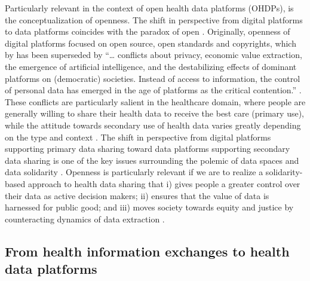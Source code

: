 \documentclass[
  authoryear]{elsarticle}
\begin{document}
Particularly relevant in the context of open health data platforms
(OHDPs), is the conceptualization of openness. The shift in perspective
from digital platforms to data platforms coincides with the paradox of
open \citep{keller2021paradox}. Originally, openness of digital
platforms focused on open source, open standards and copyrights, which
by has been superseded by ``\ldots{} conflicts about privacy, economic
value extraction, the emergence of artificial intelligence, and the
destabilizing effects of dominant platforms on (democratic) societies.
Instead of access to information, the control of personal data has
emerged in the age of platforms as the critical contention.''
\citep{keller2021paradox}. These conflicts are particularly salient in
the healthcare domain, where people are generally willing to share their
health data to receive the best care (primary use), while the attitude
towards secondary use of health data varies greatly depending on the
type and context \citep{cascini2024health}. The shift in perspective
from digital platforms supporting primary data sharing toward data
platforms supporting secondary data sharing is one of the key issues
surrounding the polemic of data spaces \citep{otto2022designing} and
data solidarity
\citep{kickbusch2021lancet, prainsack2022data, prainsack2023beyond, purtova2023data}.
Openness is particularly relevant if we are to realize a
solidarity-based approach to health data sharing that i) gives people a
greater control over their data as active decision makers; ii) ensures
that the value of data is harnessed for public good; and iii) moves
society towards equity and justice by counteracting dynamics of data
extraction \citep{prainsack2022data}.

\subsection{From health information exchanges to health data
platforms}\label{from-health-information-exchanges-to-health-data-platforms}
\end{document}
